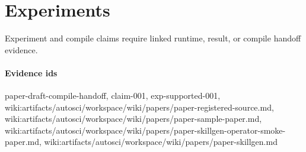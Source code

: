 \section{Experiments}
Experiment and compile claims require linked runtime, result, or compile handoff evidence.

\paragraph{Evidence ids} paper-draft-compile-handoff, claim-001, exp-supported-001, wiki:artifacts/autosci/workspace/wiki/papers/paper-registered-source.md, wiki:artifacts/autosci/workspace/wiki/papers/paper-sample-paper.md, wiki:artifacts/autosci/workspace/wiki/papers/paper-skillgen-operator-smoke-paper.md, wiki:artifacts/autosci/workspace/wiki/papers/paper-skillgen.md
